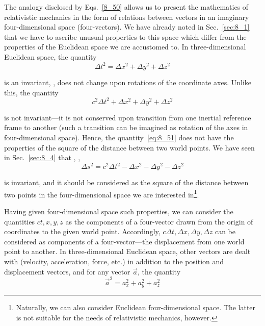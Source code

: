 The analogy disclosed by Eqs.~\eqref{8_50} allows us to present the mathematics of relativistic mechanics in the form of relations between vectors in an imaginary four-dimensional space (four-vectors). We have already noted in Sec.~\ref{sec:8_1} that we have to ascribe unusual properties to this space which differ from the properties of the Euclidean space we are accustomed to. In three-dimensional Euclidean space, the quantity
\begin{equation*}
	\Delta l^2 = \Delta x^2 + \Delta y^2 + \Delta z^2
\end{equation*}

\noindent
is an invariant, \ie, does not change upon rotations of the coordinate axes. Unlike this, the quantity
\begin{equation}\label{eq:8_51}
	c^2\Delta t^2 + \Delta x^2 + \Delta y^2 + \Delta z^2
\end{equation}

\noindent
is not invariant---it is not conserved upon transition from one inertial reference frame to another (such a transition can be imagined as rotation of the axes in four-dimensional space). Hence, the quantity~\eqref{eq:8_51} does not have the properties of the square of the distance between two world points. We have seen in Sec.~\ref{sec:8_4} that , \ie,
\begin{equation*}
	\Delta s^2 = c^2\Delta t^2 - \Delta x^2 - \Delta y^2 - \Delta z^2
\end{equation*}

\noindent
is invariant, and it should be considered as the square of the distance between two points in the four-dimensional space we are interested in\footnote{Naturally, we can also consider Euclidean four-dimensional space. The latter is not suitable for the needs of relativistic mechanics, however.}. 

Having given four-dimensional space such properties, we can consider the quantities $ct, x, y, z$ as the components of a four-vector drawn from the origin of coordinates to the given world point. Accordingly, $c\Delta t, \Delta x, \Delta y, \Delta z$ can be considered as components of a four-vector---the displacement from one world point to another. In three-dimensional Euclidean space, other vectors are dealt with (velocity, acceleration, force, etc.) in addition to the position and displacement vectors, and for any vector $\vec{a}$, the quantity 
\begin{equation*}
	\vec{a}^2 = a_x^2 + a_y^2 + a_z^2
\end{equation*}

